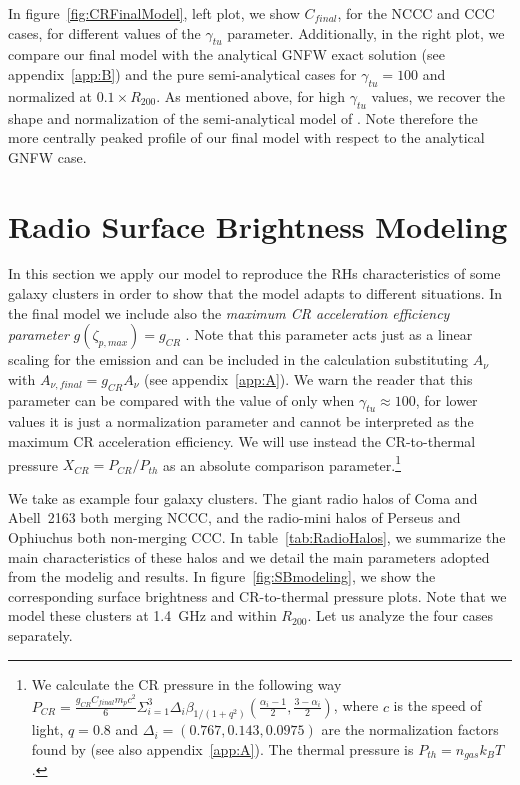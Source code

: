 \documentclass[traditabstract]{aa}
\begin{document}
In figure~\ref{fig:CRFinalModel}, left plot, we show $C_{final}$, for the NCCC and CCC cases, for different values of the $\gamma_{tu}$ parameter. Additionally, in the right plot, we compare our final model with the analytical GNFW exact solution (see appendix~\ref{app:B}) and the pure semi-analytical cases for $\gamma_{tu}=100$ and normalized at $0.1 \times R_{200}$. As mentioned above, for high $\gamma_{tu}$ values, we recover the shape and normalization of the semi-analytical model of \cite{2010MNRAS.409..449P}. Note therefore the more centrally peaked profile of our final model with respect to the analytical GNFW case.


\section{Radio Surface Brightness Modeling}
\label{sec:3}
In this section we apply our model to reproduce the RHs characteristics of some galaxy clusters in order to show that the model adapts to different situations. In the final model we include also the \emph{maximum CR acceleration efficiency parameter} $g(\zeta_{p,max})=g_{CR}$ \citep{2010MNRAS.409..449P}. Note that this parameter acts just as a linear scaling for the emission and can be included in the calculation substituting $A_{\nu}$ with $A_{\nu,final}=g_{CR}A_{\nu}$ (see appendix~\ref{app:A}). We warn the reader that this parameter can be compared with the value of \cite{2010MNRAS.409..449P} only when $\gamma_{tu}\approx100$, for lower values it is just a normalization parameter and cannot be interpreted as the maximum CR acceleration efficiency. We will use instead the CR-to-thermal pressure  $X_{CR}=P_{CR}/P_{th}$ as an absolute comparison parameter.\footnote[11]{We calculate the CR pressure in the following way $P_{CR}=\frac{g_{CR} C_{final} m_{p} c^{2}}{6} \Sigma_{i=1}^{3} \Delta_{i} \beta_{1/(1+q^2)}  \left( \frac{\alpha_{i}-1}{2},\frac{3-\alpha_{i}}{2} \right)$, where $c$ is the speed of light, $q=0.8$ \citep{2010MNRAS.409..449P} and $\Delta_{i} = (0.767, 0.143, 0.0975)$ are the normalization factors found by \cite{2010MNRAS.409..449P} (see also appendix~\ref{app:A}). The thermal pressure is $P_{th}=n_{gas}k_{B}T$.} 

We take as example four galaxy clusters. The giant radio halos of Coma \citep{1997A&A...321...55D} and Abell~2163 \citep{2001A&A...373..106F,2009A&A...499..679M} both merging NCCC, and the radio-mini halos of Perseus \citep{1990MNRAS.246..477P} and Ophiuchus \citep{2009A&A...499..371G,2009A&A...499..679M} both non-merging CCC. In table~\ref{tab:RadioHalos}, we summarize the main characteristics of these halos and we detail the main parameters adopted from the modelig and results. In figure~\ref{fig:SBmodeling}, we show the corresponding surface brightness and CR-to-thermal pressure plots. Note that we model these clusters at 1.4~GHz and within $R_{200}$. 
Let us analyze the four cases separately. 
\end{document}
